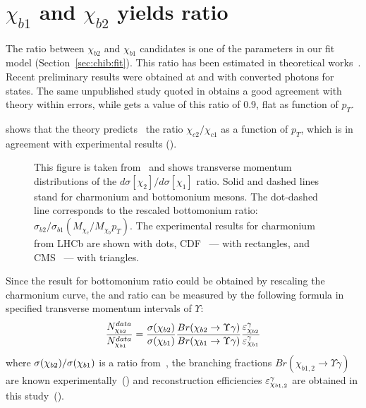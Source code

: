 \section{\texorpdfstring{$\chi_{b1}$}{chib1} and \texorpdfstring{$\chi_{b2}$}{chib2} yields ratio}
\label{sec:ratio}

The ratio between $\chi_{b2}$ and $\chi_{b1}$ candidates is one of the
parameters in our fit model (Section~\ref{sec:chib:fit}). This ratio has been
estimated in theoretical works~\cite{Likhoded:2012hw}. Recent preliminary
results were obtained at \lhcb and \cms with converted photons for \chibOneP
states. The same unpublished \lhcb study quoted in 
obtains a good agreement with theory within errors, while \cms\cite{CMS-PAS-BPH-13-005}
gets a value of this ratio of 0.9, flat as function of $p_T$.

 shows that the theory
predicts~\cite{Likhoded:2012hw} the ratio $\chi_{c2}/\chi_{c1}$ as a function
of $p_T$, which is in agreement with experimental results ().

\begin{figure}[H]
  \setlength{\unitlength}{1mm}
  \centering
  \caption {\small This figure is taken from~\cite{Likhoded:2012hw} and shows
  transverse momentum distributions of the
$d\sigma\left[\chi_{2}\right]/d\sigma[\chi_{1}]$ ratio. Solid and dashed lines
stand for charmonium and bottomonium mesons. The dot-dashed line corresponds to
the rescaled bottomonium ratio:
$\sigma_{b2}/\sigma_{b1}(M_{\chi_c}/M_{\chi_b}p_T)$. The experimental results
for charmonium from LHCb\cite{LHCb-PAPER-2013-028} are shown with dots,
CDF~\cite{Abulencia:2007bra} --- with rectangles, and CMS~\cite{Chatrchyan:2012ub}
--- with triangles.}
  \label{fig:frac:ratio}
\end{figure}

Since the result for bottomonium ratio could be obtained by rescaling the
charmonium curve, the  \chibone and \chibtwo ratio can be  measured by the
following formula in specified transverse momentum intervals of $\Upsilon$:
\begin{equation}
    \frac{N_{\chibtwo}^{data}}{N_{\chibone}^{data}} = \frac{\sigma(\chibtwo)}{\sigma(\chibone)}
    \frac{Br(\chibtwo\to\Upsilon\gamma)}{Br(\chibone\to\Upsilon\gamma)}\frac{\eps_{\chibtwo}^{\gamma}}{\eps_{\chibone}^{\gamma}}
\label{eqn:mc_ratio}
\end{equation}
\noindent where $\sigma(\chi_{b 2}) / \sigma(\chi_{b 1})$ is a ratio
from~\cite{Likhoded:2012hw}, the branching fractions $Br(\chi_{b1,2} \to \Upsilon \gamma)$ 
are known experimentally~() and reconstruction efficiencies 
$\varepsilon_{\chi_{b1,2}}^{\gamma}$ are obtained in this study~().

